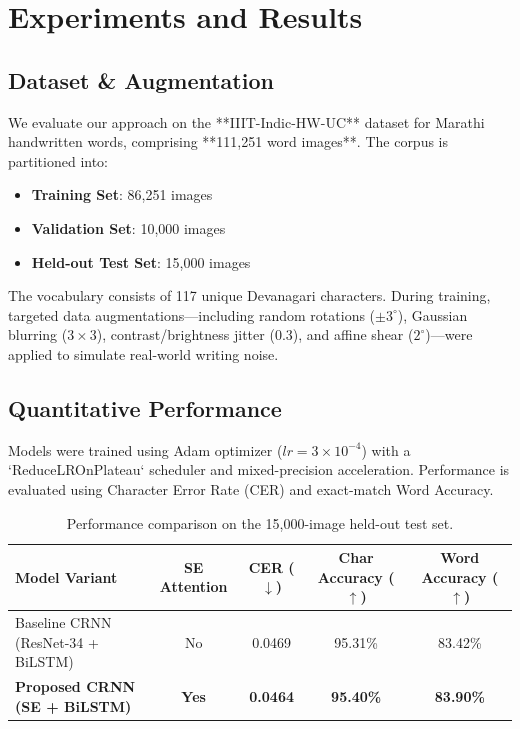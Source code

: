 \documentclass[runningheads]{llncs}
\begin{document}
\section{Experiments and Results}

\subsection{Dataset & Augmentation}
We evaluate our approach on the **IIIT-Indic-HW-UC** dataset for Marathi handwritten words, comprising **111,251 word images**. The corpus is partitioned into:
\begin{itemize}
    \item \textbf{Training Set}: 86,251 images
    \item \textbf{Validation Set}: 10,000 images
    \item \textbf{Held-out Test Set}: 15,000 images
\end{itemize}
The vocabulary consists of 117 unique Devanagari characters. During training, targeted data augmentations—including random rotations ($\pm 3^\circ$), Gaussian blurring ($3 \times 3$), contrast/brightness jitter ($0.3$), and affine shear ($2^\circ$)—were applied to simulate real-world writing noise.

\subsection{Quantitative Performance}
Models were trained using Adam optimizer ($lr=3\times 10^{-4}$) with a `ReduceLROnPlateau` scheduler and mixed-precision acceleration. Performance is evaluated using Character Error Rate (CER) and exact-match Word Accuracy.

\begin{table}[h]
\caption{Performance comparison on the 15,000-image held-out test set.}
\label{tab:results}
\centering
\begin{tabular}{lcccc}
\toprule
\textbf{Model Variant} & \textbf{SE Attention} & \textbf{CER ($\downarrow$)} & \textbf{Char Accuracy ($\uparrow$)} & \textbf{Word Accuracy ($\uparrow$)} \\
\midrule
Baseline CRNN (ResNet-34 + BiLSTM) & No & 0.0469 & 95.31\% & 83.42\% \\
\textbf{Proposed CRNN (SE + BiLSTM)} & \textbf{Yes} & \textbf{0.0464} & \textbf{95.40\%} & \textbf{83.90\%} \\
\bottomrule
\end{tabular}
\end{table}
\end{document}
